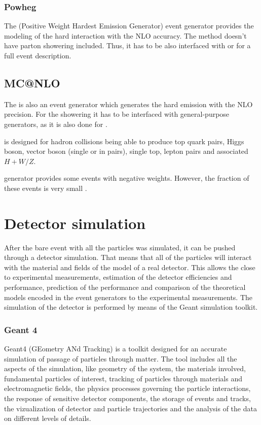 \subsubsection{Powheg}

The \Powheg (Positive Weight Hardest Emission Generator) event generator \cite{Frixione:2007vw} provides the modeling of the hard interaction 
with the NLO accuracy. The \Powheg method doesn't have parton showering included. Thus, it has to be also interfaced with \PYTHIA or
\HERWIG for a full event description.

\subsection{MC@NLO}

The \MCNLO \cite{Frixione:2002ik} is also an event generator which generates the hard emission with the NLO precision. For the showering
it has to be interfaced with general-purpose generators, as it is also done for \Powheg. 

\MCNLO is designed for hadron collisions being able to produce top quark pairs, Higgs boson, vector boson (single or in pairs), single top,
lepton pairs and associated $H+W/Z$.

\MCNLO generator provides some events with negative weights. However, the fraction of these events is very small \cite{Frixione:2002ik}.


\section{Detector simulation}

After the bare event with all the particles was simulated, it can be pushed through a detector simulation. That means that all of the particles 
will interact with the material and fields of the model of a real detector. This allows the close to experimental measurements, estimation of the 
detector efficiencies and performance, prediction of the performance and comparison of the theoretical models encoded in the event generators to
the experimental measurements. The simulation of the detector is performed by means of the Geant simulation toolkit.

\subsubsection{Geant 4}

Geant4 (GEometry ANd Tracking) \cite{Agostinelli:2002hh} is a toolkit designed for an accurate simulation of passage of particles through matter.
The tool includes all the aspects of the simulation, like geometry of the system, the materials involved, fundamental particles of interest,
tracking of particles through materials and electromagnetic fields, the physics processes governing the particle interactions, the response of
sensitive detector components, the storage of events and tracks, the vizualization of detector and particle trajectories and the analysis of
the data on different levels of details.

